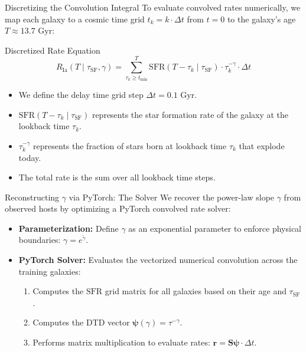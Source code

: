 \documentclass[9pt]{beamer}
\begin{document}
\begin{frame}{Discretizing the Convolution Integral}
  To evaluate convolved rates numerically, we map each galaxy to a cosmic time grid $t_k = k \cdot \Delta t$ from $t=0$ to the galaxy's age $T \approx 13.7\text{ Gyr}$:
  \begin{block}{Discretized Rate Equation}
    $$R_{\text{Ia}}(T \mid \tau_{\text{SF}}, \gamma) = \sum_{\tau_k \ge t_{\text{min}}}^{T} \text{SFR}(T - \tau_k \mid \tau_{\text{SF}}) \cdot \tau_k^{-\gamma} \cdot \Delta t$$
  \end{block}
  \begin{itemize}
    \item We define the delay time grid step $\Delta t = 0.1\text{ Gyr}$.
    \item $\text{SFR}(T - \tau_k \mid \tau_{\text{SF}})$ represents the star formation rate of the galaxy at the lookback time $\tau_k$.
    \item $\tau_k^{-\gamma}$ represents the fraction of stars born at lookback time $\tau_k$ that explode today.
    \item The total rate is the sum over all lookback time steps.
  \end{itemize}
\end{frame}

\begin{frame}{Reconstructing $\gamma$ via PyTorch: The Solver}
  We recover the power-law slope $\gamma$ from observed hosts by optimizing a PyTorch convolved rate solver:
  \begin{itemize}
    \item \textbf{Parameterization:} Define $\gamma$ as an exponential parameter to enforce physical boundaries: $\gamma = e^{\tilde{\gamma}}$.
    \item \textbf{PyTorch Solver:} Evaluates the vectorized numerical convolution across the training galaxies:
      \begin{enumerate}
        \item Computes the $\text{SFR}$ grid matrix for all galaxies based on their age and $\tau_{\text{SF}}$.
        \item Computes the DTD vector $\boldsymbol{\psi}(\gamma) = \tau^{-\gamma}$.
        \item Performs matrix multiplication to evaluate rates: $\mathbf{r} = \mathbf{S} \boldsymbol{\psi} \cdot \Delta t$.
      \end{enumerate}
  \end{itemize}
\end{frame}
\end{document}
